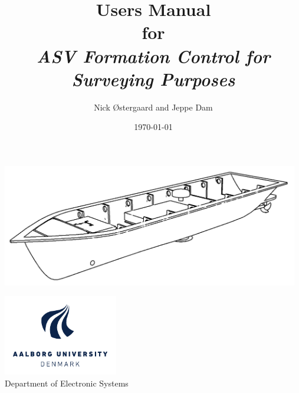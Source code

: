 \documentclass[a4paper,11pt,oneside,fleqn]{article}
\begin{document}
\author{Nick Østergaard and Jeppe Dam}
\title{Users Manual\\
	for\\
\emph{ASV Formation Control for Surveying Purposes}}
\date{\today}
\maketitle
\thispagestyle{empty}
\begin{center}
	\includegraphics[width=13cm]{fig/aauship}
\end{center}
\vfill
\begin{center}
	\includegraphics[width=5cm]{fig/AAU_LOGO_CMYK_UK}\\
	Department of Electronic Systems
\end{center}
\clearpage



\tableofcontents
\newpage








\appendix



\label{sec:bibliography}
\end{document}
